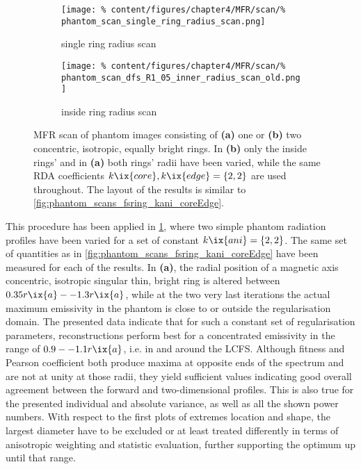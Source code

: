                 \begin{figure}[t]%
                    \centering%
                    \begin{subfigure}{0.45\textwidth}%
                        \centering%
                        \texttt{[image: \%
                            content/figures/chapter4/MFR/scan/\%
                            phantom\_scan\_single\_ring\_radius\_scan.png]}%
                        \caption{single ring radius scan}%
                    \end{subfigure}%
                    \begin{subfigure}{0.45\textwidth}%
                        \centering%
                        \texttt{[image: \%
                            content/figures/chapter4/MFR/scan/\%
                            phantom\_scan\_dfs\_R1\_05\_inner\_radius\_scan\_old.png]}%
                        \caption{inside ring radius scan}%
                    \end{subfigure}%
                    \caption{MFR scan of phantom images consisting of \textbf{(a)} one or \textbf{(b)} two concentric, isotropic, equally bright rings. In \textbf{(b)} only the inside rings' and in \textbf{(a)} both rings' radii have been varied, while the same RDA coefficients $k\ix{core}, k\ix{edge}=\left\{2, 2\right\}$ are used throughout. The layout of the results is similar to \cref{fig:phantom_scans_fsring_kani_coreEdge}.}\label{fig:phantom_scans_fsring_doubleRings}%
                \end{figure}%
%
                This procedure has been applied in \cref{fig:phantom_scans_fsring_doubleRings}, where two simple phantom radiation profiles have been varied for a set of constant $k\ix{ani}=\left\{2, 2\right\}$. The same set of quantities as in \cref{fig:phantom_scans_fsring_kani_coreEdge} have been measured for each of the results. In \textbf{(a)}, the radial position of a magnetic axis concentric, isotropic singular thin, bright ring is altered between $0.35r\ix{a}--1.3r\ix{a}$, while at the two very last iterations the actual maximum emissivity in the phantom is close to or outside the regularisation domain. The presented data indicate that for such a constant set of regularisation parameters, reconstructions perform best for a concentrated emissivity in the range of $0.9--1.1r\ix{a}$, i.e. in and around the LCFS. Although fitness and Pearson coefficient both produce maxima at opposite ends of the spectrum and are not at unity at those radii, they yield sufficient values indicating good overall agreement between the forward and two-dimensional profiles. This is also true for the presented individual and absolute variance, as well as all the shown power numbers. With respect to the first plots of extremes location and shape, the largest diameter have to be excluded or at least treated differently in terms of anisotropic weighting and statistic evaluation, further supporting the optimum up until that range.\\%
